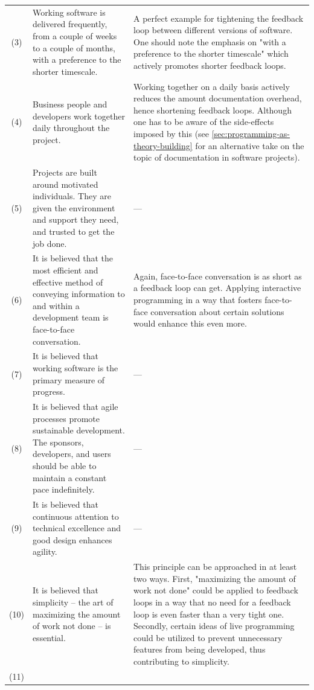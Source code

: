 \begin{block}
\begin{longtable}{@{}cp{}p{}@{}}
    (3) &
    Working software is delivered frequently, from a couple of weeks to a couple of months, with a preference to the shorter timescale. &
    A perfect example for tightening the feedback loop between different versions of software.
    One should note the emphasis on "with a preference to the shorter timescale" which actively promotes shorter feedback loops.
    \\
    (4) &
    Business people and developers work together daily throughout the project. &
    Working together on a daily basis actively reduces the amount documentation overhead, hence shortening feedback loops.
    Although one has to be aware of the side-effects imposed by this (see \ref{sec:programming-as-theory-building} for an alternative take on the topic of documentation in software projects).
    \\
    (5) &
    Projects are built around motivated individuals.
    They are given the environment and support they need, and trusted to get the job done. &
    ---
    \\
    (6) &
    It is believed that the most efficient and effective method of conveying information to and within a development team is face-to-face conversation. &
    Again, face-to-face conversation is as short as a feedback loop can get.
    Applying interactive programming in a way that fosters face-to-face conversation about certain solutions would enhance this even more.
    \\
    (7) &
    It is believed that working software is the primary measure of progress.&
    ---
    \\
    (8) &
    It is believed that agile processes promote sustainable development.
    The sponsors, developers, and users should be able to maintain a constant pace indefinitely.&
    ---
    \\
    (9) &
    It is believed that continuous attention to technical excellence and good design enhances agility.&
    ---
    \\
    (10) &
    It is believed that simplicity – the art of maximizing the amount of work not done – is essential.&
    This principle can be approached in at least two ways.
    First, "maximizing the amount of work not done" could be applied to feedback loops in a way that no need for a feedback loop is even faster than a very tight one.
    Secondly, certain ideas of live programming could be utilized to prevent unnecessary features from being developed, thus contributing to simplicity.
    \\
    (11) &

\end{longtable}
\end{block}
